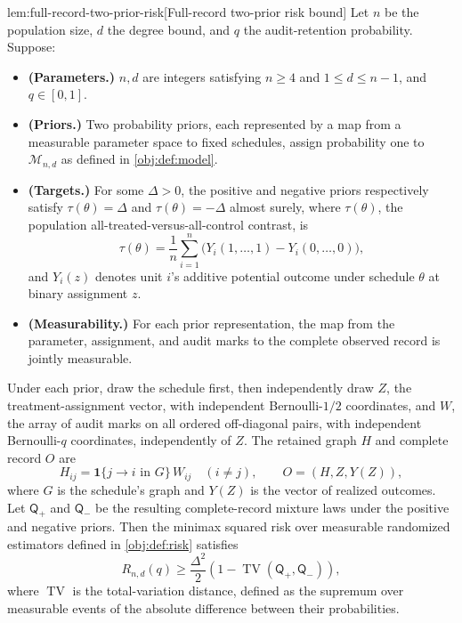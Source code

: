 \documentclass[11pt]{article}
\begin{document}
\begin{lemmav}{lem:full-record-two-prior-risk}[Full-record two-prior risk bound]
Let \(n\) be the population size, \(d\) the degree bound, and \(q\) the audit-retention probability. Suppose:
\begin{itemize}
\item \textbf{(Parameters.)} \(n,d\) are integers satisfying \(n\ge4\) and \(1\le d\le n-1\), and \(q\in[0,1]\).
\item \textbf{(Priors.)} Two probability priors, each represented by a map from a measurable parameter space to fixed schedules, assign probability one to \(\mathcal M_{n,d}\) as defined in \cref{obj:def:model}.
\item \textbf{(Targets.)} For some \(\Delta>0\), the positive and negative priors respectively satisfy \(\tau(\theta)=\Delta\) and \(\tau(\theta)=-\Delta\) almost surely, where \(\tau(\theta)\), the population all-treated-versus-all-control contrast, is
\[
\tau(\theta)=\frac1n\sum_{i=1}^{n}
\bigl(Y_i(1,\ldots,1)-Y_i(0,\ldots,0)\bigr),
\]
and \(Y_i(z)\) denotes unit \(i\)'s additive potential outcome under schedule \(\theta\) at binary assignment \(z\).
\item \textbf{(Measurability.)} For each prior representation, the map from the parameter, assignment, and audit marks to the complete observed record is jointly measurable.
\end{itemize}
Under each prior, draw the schedule first, then independently draw \(Z\), the treatment-assignment vector, with independent Bernoulli-\(1/2\) coordinates, and \(W\), the array of audit marks on all ordered off-diagonal pairs, with independent Bernoulli-\(q\) coordinates, independently of \(Z\). The retained graph \(H\) and complete record \(O\) are
\[
H_{ij}=\mathbf1\{j\to i\text{ in }G\}\,W_{ij}\quad(i\ne j),
\qquad
O=(H,Z,Y(Z)),
\]
where \(G\) is the schedule's graph and \(Y(Z)\) is the vector of realized outcomes. Let \(\mathsf Q_+\) and \(\mathsf Q_-\) be the resulting complete-record mixture laws under the positive and negative priors. Then the minimax squared risk over measurable randomized estimators defined in \cref{obj:def:risk} satisfies
\[
R_{n,d}(q)\ge
\frac{\Delta^2}{2}
\left(1-\operatorname{TV}(\mathsf Q_+,\mathsf Q_-)\right),
\]
where \(\operatorname{TV}\) is the total-variation distance, defined as the supremum over measurable events of the absolute difference between their probabilities.
\end{lemmav}
\end{document}
